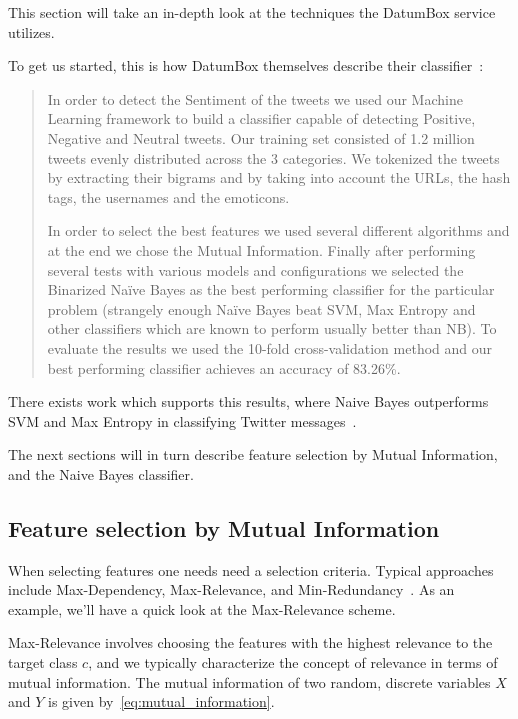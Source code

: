 This section will take an in-depth look at the techniques the DatumBox service utilizes.

To get us started, this is how DatumBox themselves describe their classifier~\cite{DatumBoxTwitterSentiment}:

\begin{quote}
  In order to detect the Sentiment of the tweets we used our Machine Learning framework to build a classifier capable of detecting Positive, Negative and Neutral tweets. Our training set consisted of 1.2 million tweets evenly distributed across the 3 categories. We tokenized the tweets by extracting their bigrams and by taking into account the URLs, the hash tags, the usernames and the emoticons.

  In order to select the best features we used several different algorithms and at the end we chose the Mutual Information. Finally after performing several tests with various models and configurations we selected the Binarized Naïve Bayes as the best performing classifier for the particular problem (strangely enough Naïve Bayes beat SVM, Max Entropy and other classifiers which are known to perform usually better than NB). To evaluate the results we used the 10-fold cross-validation method and our best performing classifier achieves an accuracy of 83.26\%.
\end{quote}

There exists work which supports this results, where Naive Bayes outperforms SVM and Max Entropy in classifying Twitter messages~\cite{go2009twitter}.

The next sections will in turn describe feature selection by Mutual Information, and the Naive Bayes classifier.

\subsection{Feature selection by Mutual Information} %
\label{sub:feature_selection_by_mutual_information}

When selecting features one needs need a selection criteria. Typical approaches include Max-Dependency, Max-Relevance, and Min-Redundancy~\cite{1453511}. As an example, we'll have a quick look at the Max-Relevance scheme.

Max-Relevance involves choosing the features with the highest relevance to the target class $c$, and we typically characterize the concept of relevance in terms of mutual information. The mutual information of two random, discrete variables $X$ and $Y$ is given by~\eqref{eq:mutual_information}.


